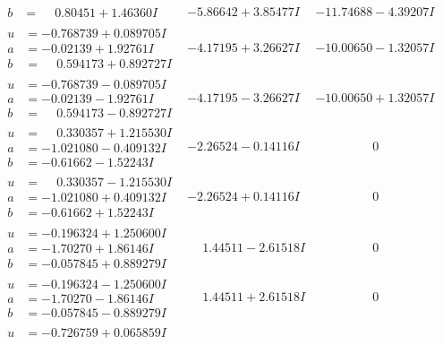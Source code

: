 \documentclass[1p]{elsarticle_modified}
\theoremstyle{definition}
\begin{document}
$$\begin{array}{c|c|c}
\begin{aligned}
b &= \phantom{-}0.80451 + 1.46360 I\end{aligned}
 & -5.86642 + 3.85477 I & -11.74688 - 4.39207 I \\ \hline\begin{aligned}
u &= -0.768739 + 0.089705 I \\
a &= -0.02139 + 1.92761 I \\
b &= \phantom{-}0.594173 + 0.892727 I\end{aligned}
 & -4.17195 + 3.26627 I & -10.00650 - 1.32057 I \\ \hline\begin{aligned}
u &= -0.768739 - 0.089705 I \\
a &= -0.02139 - 1.92761 I \\
b &= \phantom{-}0.594173 - 0.892727 I\end{aligned}
 & -4.17195 - 3.26627 I & -10.00650 + 1.32057 I \\ \hline\begin{aligned}
u &= \phantom{-}0.330357 + 1.215530 I \\
a &= -1.021080 - 0.409132 I \\
b &= -0.61662 - 1.52243 I\end{aligned}
 & -2.26524 - 0.14116 I & \phantom{-0.000000 } 0 \\ \hline\begin{aligned}
u &= \phantom{-}0.330357 - 1.215530 I \\
a &= -1.021080 + 0.409132 I \\
b &= -0.61662 + 1.52243 I\end{aligned}
 & -2.26524 + 0.14116 I & \phantom{-0.000000 } 0 \\ \hline\begin{aligned}
u &= -0.196324 + 1.250600 I \\
a &= -1.70270 + 1.86146 I \\
b &= -0.057845 + 0.889279 I\end{aligned}
 & \phantom{-}1.44511 - 2.61518 I & \phantom{-0.000000 } 0 \\ \hline\begin{aligned}
u &= -0.196324 - 1.250600 I \\
a &= -1.70270 - 1.86146 I \\
b &= -0.057845 - 0.889279 I\end{aligned}
 & \phantom{-}1.44511 + 2.61518 I & \phantom{-0.000000 } 0 \\ \hline\begin{aligned}
u &= -0.726759 + 0.065859 I \\

\end{aligned}
\end{array}$$
\end{document}
